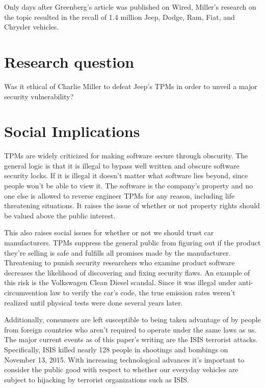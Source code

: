 \documentclass[12pt]{article}
\begin{document}
\begin{multicols}{2}
Only days after Greenberg's article was published on Wired, Miller's research on the topic resulted in the recall of 1.4 million Jeep, Dodge, Ram, Fiat, and Chrysler vehicles.\cite{guardian} 


\section{Research question} 

Was it ethical of Charlie Miller to defeat Jeep's TPMs in order to unveil a major security vulnerability?

\section{Social Implications} 


TPMs are widely criticized for making software secure through obscurity.\cite{chris} The general logic is that it is illegal to bypass well written and obscure software security locks. If it is illegal it doesn't matter what software lies beyond, since people won't be able to view it. The software is the company's property and no one else is allowed to reverse engineer TPMs for any reason, including life threatening situations.\cite{dictionary} It raises the issue of whether or not property rights should be valued above the public interest.\cite{turner}

This also raises social issues for whether or not we should trust car manufacturers. TPMs suppress the general public from figuring out if the product they're selling is safe and fulfills all promises made by the manufacturer. Threatening to punish security researchers who examine product software decreases the likelihood of discovering and fixing security flaws. An example of this risk is the Volkswagen Clean Diesel scandal. Since it was illegal under anti-circumvention law to verify the car's code, the true emission rates weren't realized until physical tests were done several years later.\cite{chris}

Additionally, consumers are left susceptible to being taken advantage of by people from foreign countries who aren't required to operate under the same laws as us.\cite{turner} 
The major current events as of this paper's writing are the ISIS terrorist attacks.\cite{isis} Specifically, ISIS killed nearly 128 people in shootings and bombings on November 13, 2015.\cite{isis} With increasing technological advances it's important to consider the public good with respect to whether our everyday vehicles are subject to hijacking by terrorist organizations such as ISIS. \cite{turner}


\end{multicols}
\end{document}
